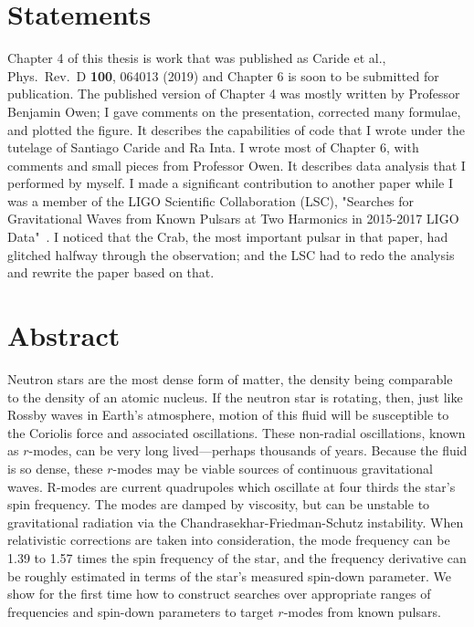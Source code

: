\documentclass{ttuthes2007}
\begin{document}
\chapter{Statements}
Chapter 4 of this thesis is work that was published as Caride et al., Phys.\
Rev.\ D \textbf{100}, 064013 (2019) and Chapter 6 is soon to be submitted for
publication. The published version of Chapter 4 was mostly written by Professor
Benjamin Owen; I gave comments on the presentation, corrected many formulae, and
plotted the figure. It describes the capabilities of code that I wrote under the
tutelage of Santiago Caride and Ra Inta. I wrote most of Chapter 6, with
comments and small pieces from Professor Owen. It describes data analysis that I
performed by myself. I made a significant contribution to another paper while I
was a member of the LIGO Scientific Collaboration (LSC), "Searches for
Gravitational Waves from Known Pulsars at Two Harmonics in 2015-2017 LIGO
Data"~\cite{Abbott1_2019}.  I noticed that the Crab, the most important pulsar
in that paper, had glitched halfway through the observation; and the LSC had to
redo the analysis and rewrite the paper based on that.

\tableofcontents	%

\chapter{\textbf{Abstract}}
Neutron stars are the most dense form of matter, the density being comparable to the
density of an atomic nucleus. If the neutron star is rotating, then, just like
Rossby waves in Earth's atmosphere, motion of this fluid will be susceptible to the
Coriolis force and associated oscillations. These non-radial oscillations, known as $r$-modes, can be very
long lived---perhaps thousands of years. Because the fluid is so dense, these
$r$-modes may be viable sources of continuous gravitational waves.  R-modes are
current quadrupoles which oscillate at four thirds the star's spin frequency. The
modes are damped by viscosity, but can be unstable to gravitational radiation via
the Chandrasekhar-Friedman-Schutz instability. When relativistic corrections are
taken into consideration, the mode frequency can be 1.39 to 1.57 times the spin
frequency of the star, and the frequency derivative can be roughly estimated in
terms of the star's measured spin-down parameter. We show for the first time how
to construct searches over appropriate ranges of frequencies and spin-down
parameters to target $r$-modes from known pulsars. 
\end{document}

